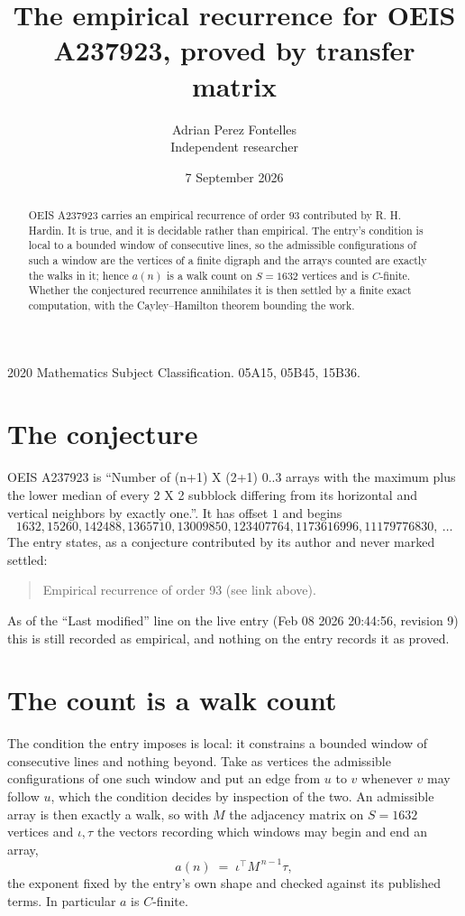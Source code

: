 \documentclass[11pt,a4paper]{article}
\title{The empirical recurrence for OEIS A237923, proved by transfer matrix}
\author{Adrian Perez Fontelles\\ \small Independent researcher}
\date{7 September 2026}
\theoremstyle{plain}
\theoremstyle{definition}
\begin{document}
\maketitle

\begin{abstract}
OEIS A237923 carries an empirical recurrence of order $93$ contributed by R. H. Hardin. It is
true, and it is decidable rather than empirical. The entry's condition is local to a bounded window of consecutive lines, so
the admissible configurations of such a window are the vertices of a finite digraph and the
arrays counted are exactly the walks in it; hence $a(n)$ is a walk count on $S=1632$ vertices
and is $C$-finite. Whether the conjectured recurrence annihilates it is then settled by a
finite exact computation, with the Cayley--Hamilton theorem bounding the work.
\end{abstract}

\noindent\small 2020 Mathematics Subject Classification. 05A15, 05B45, 15B36.\normalsize

\section{The conjecture}

OEIS A237923 is ``Number of (n+1) X (2+1) 0..3 arrays with the maximum plus the lower median of every 2 X 2 subblock differing from its horizontal and vertical neighbors by exactly one.''. It has offset $1$ and begins
\[
1632, 15260, 142488, 1365710, 13009850, 123407764, 1173616996, 11179776830,\ \dots
\]
The entry states, as a conjecture contributed by its author and never marked settled:
\begin{quote}
Empirical recurrence of order 93 (see link above).
\end{quote}
As of the ``Last modified'' line on the live entry (Feb 08 2026 20:44:56, revision 9) this is still
recorded as empirical, and nothing on the entry records it as proved.

\section{The count is a walk count}

The condition the entry imposes is local: it constrains a bounded window of consecutive lines and nothing beyond. Take as
vertices the admissible configurations of one such window and put an edge from $u$ to $v$
whenever $v$ may follow $u$, which the condition decides by inspection of the two. An
admissible array is then exactly a walk, so with $M$ the adjacency matrix on $S=1632$ vertices
and $\iota,\tau$ the vectors recording which windows may begin and end an array,
\[
a(n)\;=\;\iota^{\!\top}M^{\,n-1}\tau ,
\]
the exponent fixed by the entry's own shape and checked against its published terms. In
particular $a$ is $C$-finite.
\end{document}
